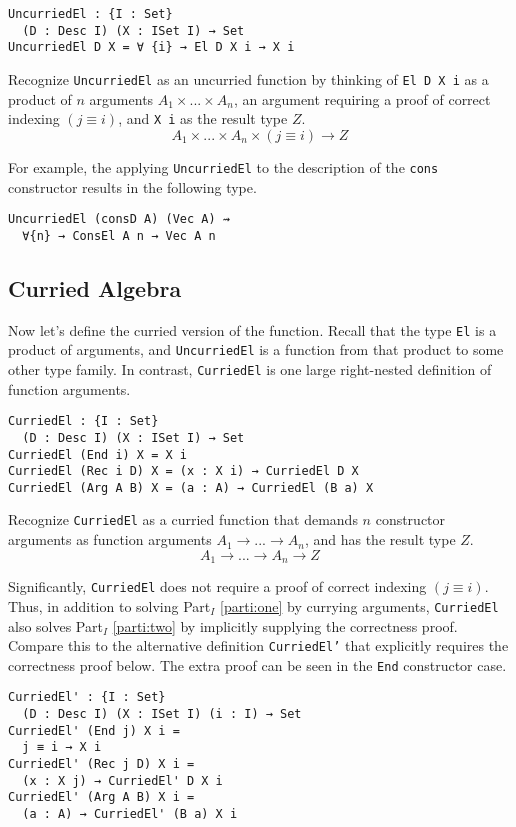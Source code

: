 \documentclass[preprint,nonatbib]{sigplanconf}
\newcommand{\refparti}[1]{Part$_I$ \ref{parti:#1}}
\begin{document}
\begin{verbatim}
UncurriedEl : {I : Set}
  (D : Desc I) (X : ISet I) → Set
UncurriedEl D X = ∀ {i} → El D X i → X i
\end{verbatim}

Recognize {\tt UncurriedEl} as an uncurried function by thinking of
{\tt El D X i} as a product of $n$ arguments $A_1 × ... × A_n$, an
argument requiring a proof of correct indexing $(j≡i)$, and
{\tt X i} as the result type $Z$.
\[
A_1 × ... × A_n × (j ≡ i) → Z
\]

For example, the applying {\tt UncurriedEl} to the description of the
{\tt cons} constructor results in the following type.

\begin{verbatim}
UncurriedEl (consD A) (Vec A) ⇝
  ∀{n} → ConsEl A n → Vec A n
\end{verbatim}

\subsection{Curried Algebra}

Now let's define the curried version of the function. Recall that the
type {\tt El} is a product of arguments, and {\tt UncurriedEl} is a
function from that product to some other type family. In contrast,
{\tt CurriedEl} is one large right-nested definition of function
arguments.

\begin{verbatim}
CurriedEl : {I : Set}
  (D : Desc I) (X : ISet I) → Set
CurriedEl (End i) X = X i
CurriedEl (Rec i D) X = (x : X i) → CurriedEl D X
CurriedEl (Arg A B) X = (a : A) → CurriedEl (B a) X
\end{verbatim}

Recognize {\tt CurriedEl} as a curried function that demands
$n$ constructor arguments as function arguments
$A_1 → ... → A_n$, and has the result type $Z$.
\[
A_1 → ... → A_n → Z
\]

Significantly, {\tt CurriedEl} does not require a proof of correct
indexing $(j≡i)$. Thus, in addition to solving \refparti{one} by
currying arguments, {\tt CurriedEl} also solves \refparti{two} by
implicitly supplying the correctness proof. Compare this to the
alternative definition {\tt CurriedEl'} that explicitly requires the
correctness proof below. The extra proof can be seen in the
{\tt End} constructor case.

\begin{verbatim}
CurriedEl' : {I : Set}
  (D : Desc I) (X : ISet I) (i : I) → Set
CurriedEl' (End j) X i =
  j ≡ i → X i
CurriedEl' (Rec j D) X i =
  (x : X j) → CurriedEl' D X i
CurriedEl' (Arg A B) X i =
  (a : A) → CurriedEl' (B a) X i
\end{verbatim}
\end{document}
